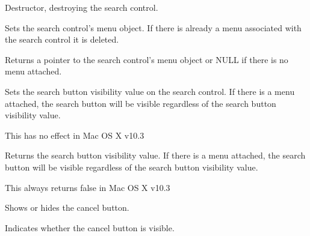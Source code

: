 
Destructor, destroying the search control.


\label{wxsearchctrlsetmenu}


Sets the search control's menu object.  If there is already a menu associated with
the search control it is deleted.




\label{wxsearchctrlgetmenu}


Returns a pointer to the search control's menu object or NULL if there is no 
menu attached.


\label{wxsearchctrlshowsearchbutton}


Sets the search button visibility value on the search control.  
If there is a menu attached, the search button will be visible regardless of the search
button visibility value. 

This has no effect in Mac OS X v10.3


\label{wxsearchctrlissearchbuttonvisible}


Returns the search button visibility value.  
If there is a menu attached, the search button will be visible regardless of the search
button visibility value. 

This always returns false in Mac OS X v10.3


\label{wxsearchctrlshowcancelbutton}


Shows or hides the cancel button.


\label{wxsearchctrliscancelbuttonvisible}


Indicates whether the cancel button is visible.
